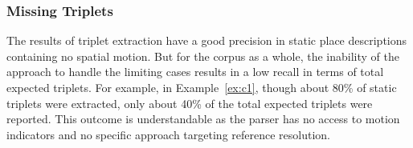 \documentclass[letter]{sig-alternate}
\begin{document}
\subsubsection{Missing Triplets}
\label{missing}
The results of triplet extraction have a good precision in static place descriptions containing no spatial motion. But for the corpus as a whole,
the inability of the approach to handle the limiting cases results in a low recall in terms of total expected triplets. For example, in Example~\ref{ex:c1}, though about 80\% of static triplets were extracted, only about 40\% of the total expected triplets 
were reported. 
This outcome is understandable as the parser has no access to motion indicators and no specific approach targeting reference resolution.
\end{document}
